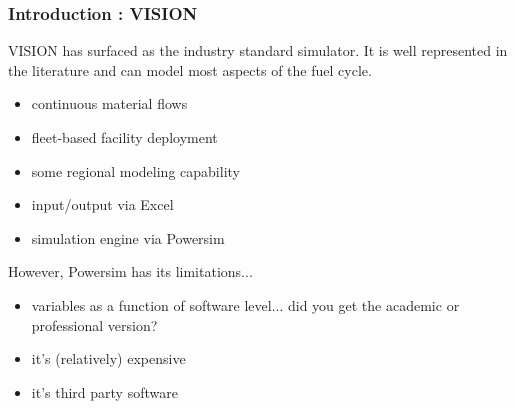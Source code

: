 \begin{frame}[ctb!]
  \frametitle{Introduction : VISION}
  VISION has surfaced as the industry standard simulator. It is well
  represented in the literature and can model most aspects of the
  fuel cycle. \cite{yacout_vision_2006}
  \begin{itemize}
    \item continuous material flows
    \item fleet-based facility deployment
    \item some regional modeling capability
    \item input/output via Excel
    \item simulation engine via Powersim
  \end{itemize}
  However, Powersim has its limitations...
  \begin{itemize}
    \item variables as a function of software level... did you get the academic or professional version?
    \item it's (relatively) expensive
    \item it's third party software
  \end{itemize}
\end{frame}
